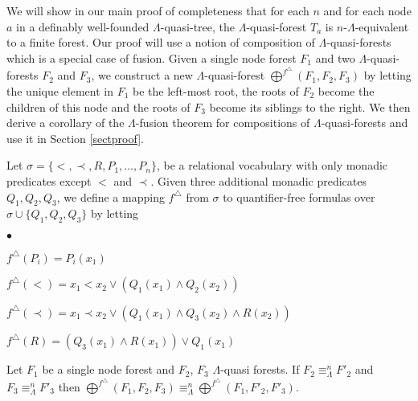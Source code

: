\documentclass{LMCS}
\begin{document}
We will show in our main proof of completeness that for each $n$ and for each node $a$ in a
definably well-founded $\Lambda$-quasi-tree, the $\Lambda$-quasi-forest $T_a$ is $n$-$\Lambda$-equivalent to a finite forest.
Our proof will use a notion of composition of $\Lambda$-quasi-forests which is a special case of fusion.
Given a single node forest $F_1$ and two $\Lambda$-quasi-forests $F_2$ and
$F_3$, we construct a new $\Lambda$-quasi-forest $\bigoplus^{f^\triangle}(F_1,F_2,F_3)$ by letting
the unique element in $F_1$ be the left-most root, the roots of $F_2$ become the children of this node and the roots of $F_3$ become its siblings to the right. We then derive a corollary of the $\Lambda$-fusion theorem for compositions of $\Lambda$-quasi-forests and use it in Section \ref{sectproof}.

\begin{defi}
Let $\sigma = \{<, \prec, R, P_1, \ldots, P_n\}$, be a relational vocabulary with only monadic predicates except $<$ and $\prec$. Given three
additional monadic predicates $Q_1, Q_2, Q_3$, we define a mapping $f^\triangle$ from $\sigma$ to quantifier-free formulas over $\sigma \cup \{Q_1,
Q_2, Q_3\}$ by letting
\begin{iteMize}{$\bullet$}
\item   $f^\triangle(P_i)=P_i(x_1)$
 \item  $f^\triangle(<) = x_1<x_2 \vee (Q_1(x_1) \wedge Q_2(x_2))$
 \item  $f^\triangle(\prec)= x_1 \prec x_2 \vee (Q_1(x_1) \wedge Q_3(x_2) \wedge R(x_2))$
\item   $f^\triangle(R)=(Q_3(x_1) \wedge R(x_1)) \vee Q_1(x_1)$
\end{iteMize}
\end{defi}
\begin{cor}
Let $F_1$ be a single node forest and $F_2$, $F_3$ $\Lambda$-quasi forests. If $F_2\equiv_\Lambda^n F'_2$ and $F_3\equiv_\Lambda^n F'_3$ then
$\bigoplus^{f^\triangle}(F_1,F_2,F_3)\equiv_\Lambda^n \bigoplus^{f^\triangle}(F_1,F'_2,F'_3)$.
\end{cor}
\end{document}
